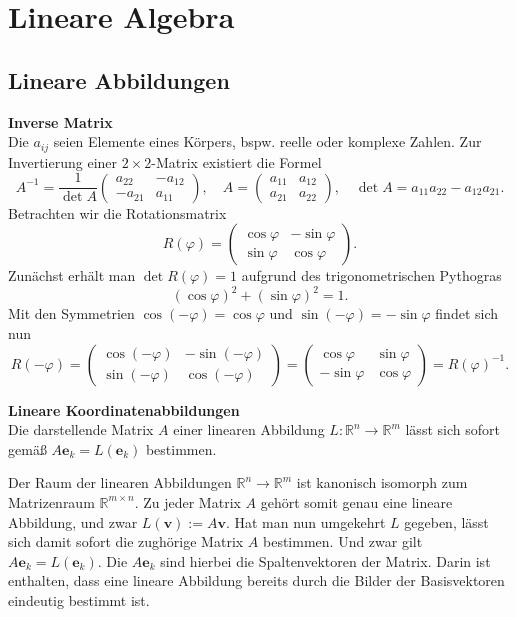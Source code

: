 \documentclass[paper=180mm:225mm,pagesize=auto,fleqn,twoside,11pt,dvipdfmx]{scrartcl}
\theoremstyle{rmbox}
\newenvironment{Rezept}[1]{\strong{#1}\\}{}
\newcommand{\strong}[1]{\textsf{\textbf{#1}}}
\newcommand{\bv}[1]{\mathbf{#1}}
\newcommand{\R}{\mathbb R}
\begin{document}
\newpage
\section{Lineare Algebra}

\subsection{Lineare Abbildungen}

\begin{Rezept}{Inverse Matrix}
Die $a_{ij}$ seien Elemente eines Körpers, bspw. reelle
oder komplexe Zahlen. Zur Invertierung einer $2\times 2$-Matrix
existiert die Formel
\[A^{-1} = \frac{1}{\det A}\begin{pmatrix}
a_{22} & -a_{12}\\
-a_{21} & a_{11}
\end{pmatrix},\quad A = \begin{pmatrix}
a_{11} & a_{12}\\
a_{21} & a_{22}
\end{pmatrix},\quad\det A = a_{11}a_{22}-a_{12}a_{21}.\]
\end{Rezept}
Betrachten wir die Rotationsmatrix
\[R(\varphi) = \begin{pmatrix}\cos\varphi & -\sin\varphi\\
\sin\varphi & \cos\varphi\end{pmatrix}.\]
Zunächst erhält man $\det R(\varphi) = 1$ aufgrund des trigonometrischen
Pythogras
\[(\cos\varphi)^2+(\sin\varphi)^2=1.\]
Mit den Symmetrien $\cos(-\varphi)=\cos\varphi$
und $\sin(-\varphi) = -\sin\varphi$ findet sich nun
\[R(-\varphi) = \begin{pmatrix}
\cos(-\varphi) & -\sin(-\varphi)\\
\sin(-\varphi) & \cos(-\varphi)
\end{pmatrix} = \begin{pmatrix}
\cos\varphi & \sin\varphi\\
-\sin\varphi & \cos \varphi
\end{pmatrix} = R(\varphi)^{-1}.\]

\begin{Rezept}{Lineare Koordinatenabbildungen}
Die darstellende Matrix $A$ einer linearen Abbildung $L\colon\R^n\to\R^m$
lässt sich sofort gemäß $A\bv e_k = L(\bv e_k)$ bestimmen.
\end{Rezept}

\noindent
Der Raum der linearen Abbildungen $\R^n\to\R^m$ ist kanonisch isomorph
zum Matrizenraum $\R^{m\times n}$. Zu jeder Matrix $A$ gehört somit
genau eine lineare Abbildung, und zwar $L(\bv v):=A\bv v$. Hat man nun
umgekehrt $L$ gegeben, lässt sich damit sofort die zughörige Matrix
$A$ bestimmen. Und zwar gilt $A\bv e_k = L(\bv e_k)$. Die $A\bv e_k$
sind hierbei die Spaltenvektoren der Matrix. Darin ist enthalten,
dass eine lineare Abbildung bereits durch die Bilder der Basisvektoren
eindeutig bestimmt ist.
\end{document}

